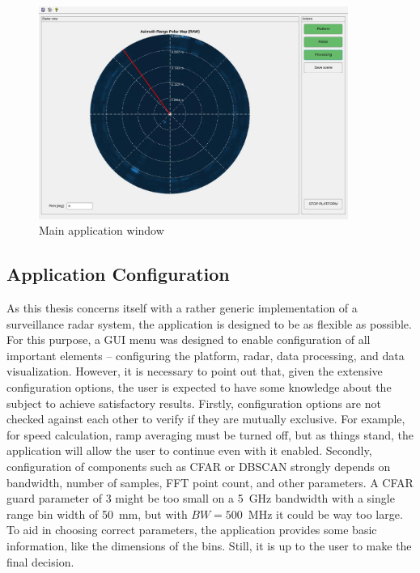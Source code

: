\begin{figure}[h!]
  \centering
  \includegraphics[width=0.9\textwidth]{../img/vis_range_azimuth.jpg}
  \caption[Main application window]{Main application window}
  \label{fig:main_window}
\end{figure}

\subsection{Application Configuration}

As this thesis concerns itself with a rather generic implementation of a surveillance radar system, the application is designed to be as flexible as possible.
For this purpose, a GUI menu was designed to enable configuration of all important elements -- configuring the platform, radar, data processing, and data visualization.
However, it is necessary to point out that, given the extensive configuration options, the user is expected to have some knowledge about the subject to achieve satisfactory results.
Firstly, configuration options are not checked against each other to verify if they are mutually exclusive.
For example, for speed calculation, ramp averaging must be turned off, but as things stand, the application will allow the user to continue even with it enabled.
Secondly, configuration of components such as CFAR or DBSCAN strongly depends on bandwidth, number of samples, FFT point count, and other parameters.
A CFAR guard parameter of 3 might be too small on a 5~GHz bandwidth with a single range bin width of 50~mm, but with $BW=500$~MHz it could be way too large.
To aid in choosing correct parameters, the application provides some basic information, like the dimensions of the bins.
Still, it is up to the user to make the final decision.

